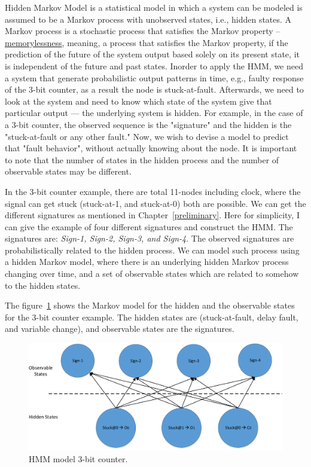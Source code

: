 Hidden Markov Model is a statistical model in which a system can be modeled is assumed to be a Markov process with unobserved states, i.e., hidden states. A Markov process  is a stochastic process that satisfies the Markov property -- \underline{memorylessness}, meaning, a process that satisfies the Markov property, if the prediction of the future of the system output based solely on its present state, it is independent of the future and past states. Inorder to apply the HMM, we need a system that generate probabilistic output patterns in time, e.g., faulty response of the 3-bit counter, as a result the node is stuck-at-fault. Afterwards, we need to look at the system and need to know which state of the system give that particular output ---  the underlying system is hidden. For example, in the case of a 3-bit counter, the observed sequence is the "signature" and the hidden is the "stuck-at-fault or any other fault." Now, we wish to devise a model to predict that "fault behavior", without actually knowing about the node. It is important to note that the number of states in the hidden process and the number of observable states may be different. 


In the 3-bit counter example, there are total 11-nodes including clock, where the signal can get stuck (stuck-at-1, and stuck-at-0) both are possible. We can get the  different signatures as mentioned in Chapter~\ref{preliminary}. Here for simplicity, I can give the example of four different signatures and construct the HMM. The signatures are: \textit{Sign-1, Sign-2, Sign-3, and Sign-4}. The observed signatures are probabilistically related to the hidden process. We can model such process using a hidden Markov model, where there is an underlying hidden Markov process changing over time, and a set of observable states which are related to somehow to the hidden states.


The figure~\ref{fig:HMM-3-bit} shows the Markov model for the hidden and the observable states for the 3-bit counter example. The hidden states are (stuck-at-fault, delay fault, and variable change), and observable states are  the signatures. 


\begin{figure}[tb!]

 \centering
  \captionsetup{justification=centering}    
   \includegraphics[scale=0.8]{Figures/HMM.pdf}
   \caption{HMM model 3-bit counter.}
\label{fig:HMM-3-bit}
\end{figure}





